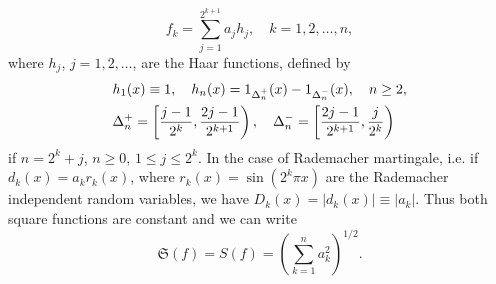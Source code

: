 \documentclass[12pt,reqno,fleqn]{amsart}
\theoremstyle{definition}
\theoremstyle{definition}
\theoremstyle{remark}
\def\ZS{\ensuremath{\mathfrak S}}
\def\ZI{\ensuremath{\textbf 1}}
\numberwithin{equation}{section}
\begin{document}
\begin{equation*}
	f_k=\sum_{j=1}^{2^{k+1}}a_jh_j,\quad k=1,2,\ldots,n,
\end{equation*} 
where $h_j$, $j=1,2,\ldots$, are the Haar functions, defined by 
\begin{align}
	&h_1(x)\equiv 1,\quad h_n(x)=\ZI_{\Delta_n^+}(x)-\ZI_{\Delta_n^-}(x),\quad n\ge 2,\\
	&\Delta_n^+=\left[\frac{j-1}{2^k},\frac{2j-1}{2^{k+1}}\right),\quad \Delta_n^-=\left[\frac{2j-1}{2^{k+1}},\frac{j}{2^k}\right)\label{x66}
\end{align}
if $n=2^k+j$, $n\ge0$, $1\le j\le 2^k$. In the case of Rademacher martingale, i.e. if $d_k(x)=a_kr_k(x)$, where $r_k(x)=\sin(2^k\pi x)$ are the Rademacher independent random variables, we have $D_k(x)=|d_k(x)|\equiv |a_k|$. Thus both square functions are constant and we can write
\begin{equation}
	\ZS(f)=S(f)=\left(\sum_{k=1}^na_k^2\right)^{1/2}.
\end{equation}
\end{document}
